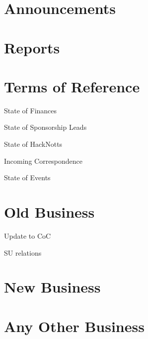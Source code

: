 \documentclass[11pt,hacksoc,agenda]{meetingmins}
\begin{document}
\maketitle

\section{Announcements}

\section{Reports}

\section{Terms of Reference}
\begin{items}
\item {State of Finances}
\item {State of Sponsorship Leads}
\item {State of HackNotts}
\item {Incoming Correspondence}
\item {State of Events}
\end{items}

\section{Old Business}
\begin{items}
\item Update to CoC 
\item SU relations
\end{items}

\section{New Business}

\section{Any Other Business}

\vspace{1em}
\end{document}
